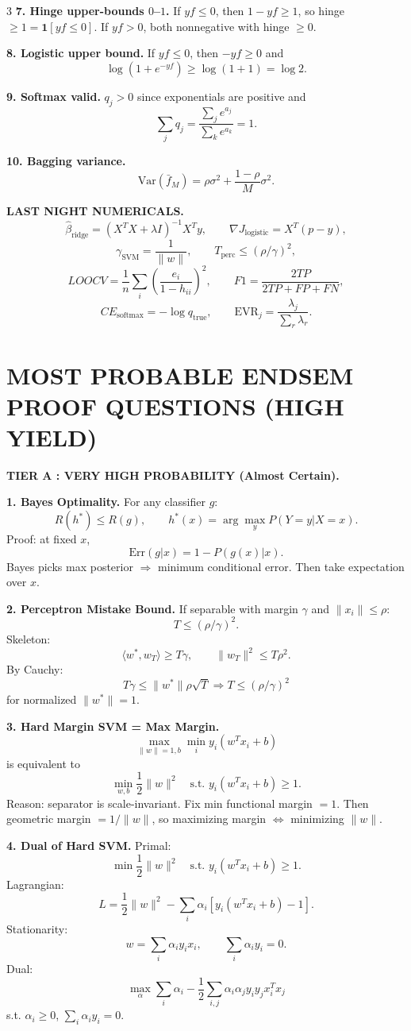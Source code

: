 \documentclass[8pt,fleqn]{extarticle}
\begin{document}
\begin{multicols}{3}
\textbf{7. Hinge upper-bounds $0$--$1$.} If $yf\le0$, then $1-yf\ge1$, so hinge $\ge1=\mathbf{1}[yf\le0]$. If $yf>0$, both nonnegative with hinge $\ge0$.

\textbf{8. Logistic upper bound.} If $yf\le0$, then $-yf\ge0$ and
\[
\log(1+e^{-yf})\ge \log(1+1)=\log2.
\]

\textbf{9. Softmax valid.} $q_j>0$ since exponentials are positive and
\[
\sum_j q_j=\frac{\sum_j e^{a_j}}{\sum_k e^{a_k}}=1.
\]

\textbf{10. Bagging variance.}
\[
\mathrm{Var}(\bar f_M)=\rho\sigma^2+\frac{1-\rho}{M}\sigma^2.
\]

\textbf{LAST NIGHT NUMERICALS.}
\[
\hat\beta_{\text{ridge}}=(X^TX+\lambda I)^{-1}X^Ty,\qquad
\nabla J_{\text{logistic}}=X^T(p-y),
\]
\[
\gamma_{\text{SVM}}=\frac{1}{\|w\|},\qquad
T_{\text{perc}}\le(\rho/\gamma)^2,
\]
\[
LOOCV=\frac1n\sum_i\left(\frac{e_i}{1-h_{ii}}\right)^2,\qquad
F1=\frac{2TP}{2TP+FP+FN},
\]
\[
CE_{\text{softmax}}=-\log q_{\text{true}},\qquad
\mathrm{EVR}_j=\frac{\lambda_j}{\sum_r\lambda_r}.
\]

\section*{MOST PROBABLE ENDSEM PROOF QUESTIONS (HIGH YIELD)}

\textbf{TIER A : VERY HIGH PROBABILITY (Almost Certain).}

\textbf{1. Bayes Optimality.}
For any classifier $g$:
\[
R(h^*)\le R(g),\qquad h^*(x)=\arg\max_y P(Y=y|X=x).
\]
Proof: at fixed $x$,
\[
\mathrm{Err}(g|x)=1-P(g(x)|x).
\]
Bayes picks max posterior $\Rightarrow$ minimum conditional error. Then take expectation over $x$.

\textbf{2. Perceptron Mistake Bound.}
If separable with margin $\gamma$ and $\|x_i\|\le\rho$:
\[
T\le(\rho/\gamma)^2.
\]
Skeleton:
\[
\langle w^*,w_T\rangle\ge T\gamma,\qquad \|w_T\|^2\le T\rho^2.
\]
By Cauchy:
\[
T\gamma\le \|w^*\|\rho\sqrt T \Rightarrow T\le(\rho/\gamma)^2
\]
for normalized $\|w^*\|=1$.

\textbf{3. Hard Margin SVM = Max Margin.}
\[
\max_{\|w\|=1,b}\min_i y_i(w^Tx_i+b)
\]
is equivalent to
\[
\min_{w,b}\frac12\|w\|^2\quad\text{s.t. }y_i(w^Tx_i+b)\ge1.
\]
Reason: separator is scale-invariant. Fix min functional margin $=1$. Then geometric margin $=1/\|w\|$, so maximizing margin $\Leftrightarrow$ minimizing $\|w\|$.

\textbf{4. Dual of Hard SVM.}
Primal:
\[
\min \frac12\|w\|^2 \quad \text{s.t. } y_i(w^Tx_i+b)\ge1.
\]
Lagrangian:
\[
L=\frac12\|w\|^2-\sum_i\alpha_i[y_i(w^Tx_i+b)-1].
\]
Stationarity:
\[
w=\sum_i\alpha_i y_i x_i,\qquad \sum_i\alpha_i y_i=0.
\]
Dual:
\[
\max_\alpha \sum_i\alpha_i-\frac12\sum_{i,j}\alpha_i\alpha_j y_i y_j x_i^Tx_j
\]
s.t. $\alpha_i\ge0$, $\sum_i\alpha_i y_i=0$.


\end{multicols}
\end{document}
